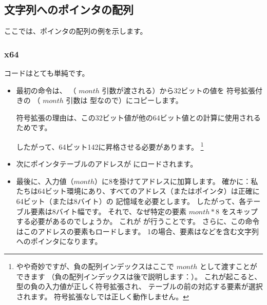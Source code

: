 ﻿\subsection{文字列へのポインタの配列}
\label{array_of_pointers_to_strings}

ここでは、ポインタの配列の例を示します。



\subsubsection{x64}



コードはとても単純です。

\begin{itemize}

\item
{}

最初の命令は、 \ECX （ $month$ 引数が渡される）から32ビットの値を
符号拡張付きの \RAX （ $month$ 引数は \Tint 型なので）にコピーします。

符号拡張の理由は、この32ビット値が他の64ビット値との計算に使用されるためです。

したがって、64ビット142に昇格させる必要があります。%
\footnote{やや奇妙ですが、負の配列インデックスはここで $month$ として渡すことができます
（負の配列インデックスは後で説明します：）。 
これが起こると、 \Tint 型の負の入力値が正しく符号拡張され、
テーブルの前の対応する要素が選択されます。 符号拡張なしでは正しく動作しません。}

\item
次にポインタテーブルのアドレスが \RCX にロードされます。

\item
最後に、入力値（$month$）に8を掛けてアドレスに加算します。 
確かに：私たちは64ビット環境にあり、すべてのアドレス（またはポインタ）は正確に64ビット（または8バイト）の
記憶域を必要とします。 
したがって、各テーブル要素は8バイト幅です。 
それで、なぜ特定の要素 $month*8$ をスキップする必要があるのでしょうか。
これが \MOV が行うことです。 
さらに、この命令はこのアドレスの要素もロードします。 
1の場合、要素はなどを含む文字列へのポインタになります。

\end{itemize}

